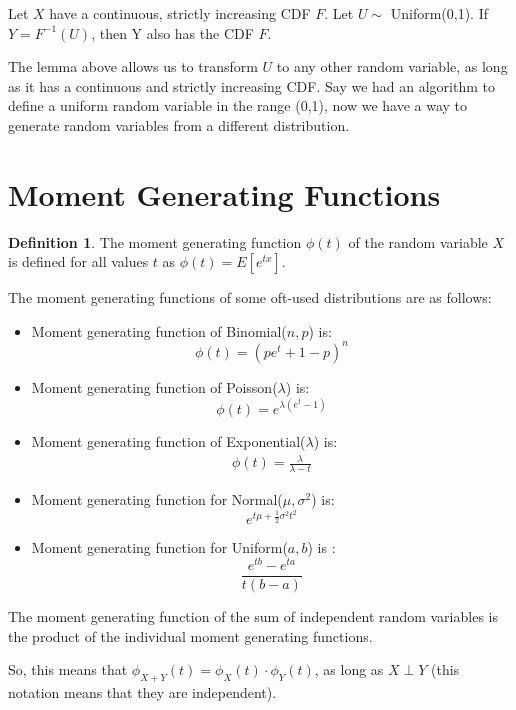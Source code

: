 \documentclass[12pt,letterpaper]{book}
\theoremstyle{definition}
\newtheorem{definition}{Definition}%
\begin{document}
\begin{lemma}
  Let $X$ have a continuous, strictly increasing CDF $F$. Let $U \sim $ Uniform(0,1). If $Y = F^{-1}(U)$, then Y also has the CDF $F$. 
\end{lemma}

The lemma above allows us to transform $U$ to any other random variable, as long as it has a continuous and strictly increasing CDF. Say we had an algorithm to define a uniform random variable in the range (0,1), now we have a way to generate random variables from a different distribution.

\section{Moment Generating Functions}

\begin{definition}
  The moment generating function $\phi(t)$ of the random variable $X$ is defined for all values $t$ as $\phi(t) = E[e^{tx}]$.
\end{definition}

The moment generating functions of some oft-used distributions are as follows:

\begin{itemize}
  \item Moment generating function of Binomial($n,p$) is:
    \[ \phi(t) = (pe^t + 1 - p)^n\]
  \item Moment generating function of Poisson($\lambda$) is:
    \[  \phi(t) = e^{\lambda(e^t-1)}\]
  \item Moment generating function of Exponential($\lambda$) is:
    \begin{align*}
      \phi(t) = \frac{\lambda}{\lambda-t}
    \end{align*}
  \item Moment generating function for Normal($\mu, \sigma^2$) is:
    \[e^{t \mu + \frac{1}{2} \sigma^2 t^2}\]
  \item Moment generating function for Uniform($a,b$) is :
    \[\frac{e^{tb} - e^{ta}}{t(b-a)}\]
\end{itemize}

\begin{theorem}
  The moment generating function of the sum of independent random variables is the product of the individual moment generating functions.
\end{theorem}

So, this means that $\phi_{X+Y}(t) = \phi_X(t) \cdot \phi_Y(t)$, as long as $X \perp Y$ (this notation means that they are independent).
\end{document}
